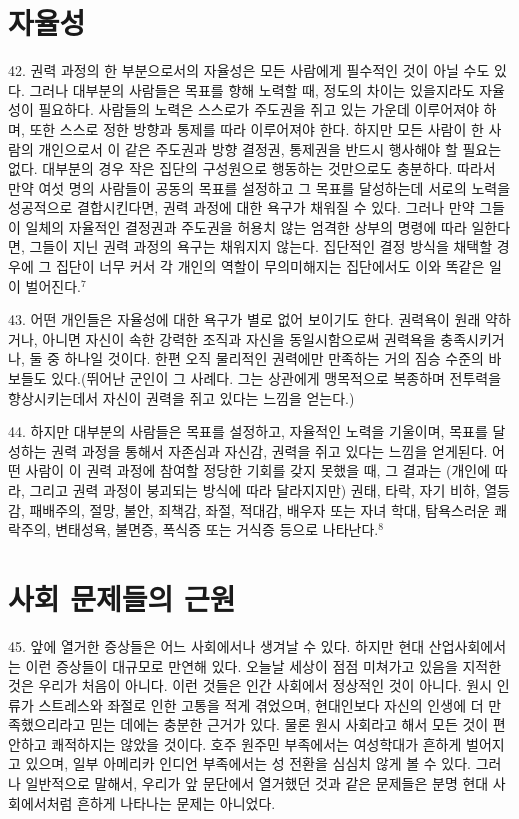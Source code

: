 \documentclass[11pt,a4paper]{article}
\begin{document}
\begin{multicols}{2}
\section*{자율성} 
42. 권력 과정의 한 부분으로서의 자율성은 모든 사람에게 필수적인 것이 아닐 수도 있다. 그러나  대부분의 사람들은 목표를 향해 노력할 때, 정도의 차이는 있을지라도 자율성이 필요하다. 사람들의 
노력은 스스로가 주도권을 쥐고 있는 가운데 이루어져야 하며, 또한 스스로 정한 방향과 통제를 따라  이루어져야 한다. 하지만 모든 사람이 한 사람의 개인으로서 이 같은 주도권과 방향 결정권, 통제권을  반드시 행사해야 할 필요는 없다. 대부분의 경우 작은 집단의 구성원으로 행동하는 것만으로도 충분하다.  따라서 만약 여섯 명의 사람들이 공동의 목표를 설정하고 그 목표를 달성하는데 서로의 노력을  성공적으로 결합시킨다면, 권력 과정에 대한 욕구가 채워질 수 있다. 그러나 만약 그들이 일체의 자율적인 결정권과 주도권을 허용치 않는 엄격한 상부의 명령에 따라 일한다면, 그들이 지닌 권력 과정의 욕구는  채워지지 않는다. 집단적인 결정 방식을 채택할 경우에 그 집단이 너무 커서 각 개인의 역할이  무의미해지는 집단에서도 이와 똑같은 일이 벌어진다.\hyperlink{7}{$^{7}$} 


43. 어떤 개인들은 자율성에 대한 욕구가 별로 없어 보이기도 한다. 권력욕이 원래 약하거나, 아니면  자신이 속한 강력한 조직과 자신을 동일시함으로써 권력욕을 충족시키거나, 둘 중 하나일 것이다. 한편 오직 물리적인 권력에만 만족하는 거의 짐승 수준의 바보들도 있다.(뛰어난 군인이 그 사례다. 그는  상관에게 맹목적으로 복종하며 전투력을 향상시키는데서 자신이 권력을 쥐고 있다는 느낌을 얻는다.) 


44. 하지만 대부분의 사람들은 목표를 설정하고, 자율적인 노력을 기울이며, 목표를 달성하는 권력  과정을 통해서 자존심과 자신감, 권력을 쥐고 있다는 느낌을 얻게된다. 어떤 사람이 이 권력 과정에  참여할 정당한 기회를 갖지 못했을 때, 그 결과는 (개인에 따라, 그리고 권력 과정이 붕괴되는 방식에 따라 달라지지만) 권태, 타락, 자기 비하, 열등감, 패배주의, 절망, 불안, 죄책감, 좌절, 적대감, 배우자 또는  자녀 학대, 탐욕스러운 쾌락주의, 변태성욕, 불면증, 폭식증 또는 거식증 등으로 나타난다.\hyperlink{8}{$^{8}$} 


\section*{사회 문제들의 근원} 
45. 앞에 열거한 증상들은 어느 사회에서나 생겨날 수 있다. 하지만 현대 산업사회에서는 이런 증상들이  대규모로 만연해 있다. 오늘날 세상이 점점 미쳐가고 있음을 지적한 것은 우리가 처음이 아니다. 이런  것들은 인간 사회에서 정상적인 것이 아니다. 원시 인류가 스트레스와 좌절로 인한 고통을 적게 겪었으며, 현대인보다 자신의 인생에 더 만족했으리라고 믿는 데에는 충분한 근거가 있다. 물론 원시 사회라고 해서  모든 것이 편안하고 쾌적하지는 않았을 것이다. 호주 원주민 부족에서는 여성학대가 흔하게 벌어지고  있으며, 일부 아메리카 인디언 부족에서는 성 전환을 심심치 않게 볼 수 있다. 그러나 일반적으로 말해서,  우리가 앞 문단에서 열거했던 것과 같은 문제들은 분명 현대 사회에서처럼 흔하게 나타나는 문제는  아니었다. 



\end{multicols}
\end{document}
